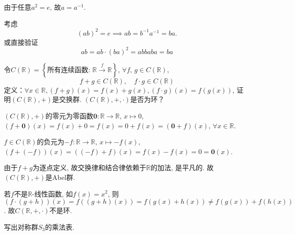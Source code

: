 \begin{solution}
    由于任意$a^2 = e$, 故$a = a^{-1}$.

    考虑
\[
    (ab)^2 = e \implies ab = b^{-1}a^{-1} = ba.
\]
    或直接验证
\[
    ab = ab \cdot (ba)^2 = abbaba = ba
\]
\end{solution}

\begin{problem}
    令$C(\mathbb{R} ) = \left\{\text{所有连续函数: } \mathbb{R} \overset{f}\to \mathbb{R} \right\}$,
$\forall f ,\, g \in C(\mathbb{R})$,
\[
    f + g \in C(\mathbb{R}),\quad f \cdot g \in C(\mathbb{R})
\]
定义：$\forall x \in \mathbb{R}, (f + g)(x) = f(x) + g(x), (f \cdot g)(x) = f(g(x))$,
证明$(C(\mathbb{R}), +)$是交换群. $(C(\mathbb{R}), +, \cdot)$是否为环？
\end{problem}

\begin{solution}
    $(C(\mathbb{R}), +)$的零元为零函数$\mathbf{0}: \mathbb{R} \to \mathbb{R},\, x \mapsto 0$,
$(f + \mathbf{0})(x) = f(x) + 0 = f(x) = 0 + f(x) = (\mathbf{0} + f)(x),\, \forall x \in \mathbb{R}$.

    $f \in C(\mathbb{R})$的负元为$-f: \mathbb{R} \to \mathbb{R},\, x \mapsto -f(x)$,
$(f + (-f))(x) = ((-f) + f)(x) = f(x) - f(x) = 0 = \mathbf{0}(x)$.

    由于$f + g$为逐点定义, 故交换律和结合律依赖于$\mathbb{R}$的加法, 是平凡的.
故$(C(\mathbb{R}), +)$是Abel群.

    若$f$不是$\mathbb{R}$-线性函数, 如$f(x) = x^2$, 则$(f \cdot (g + h))(x) = f((g + h)(x)) = f(g(x) + h(x)) \neq f(g(x)) + f(h(x))$.
故$C(\mathbb{R}, +, \cdot)$不是环.
\end{solution}

\begin{problem}\label{ex:1.3.5}
    写出对称群$S_3$的乘法表.
\end{problem}

